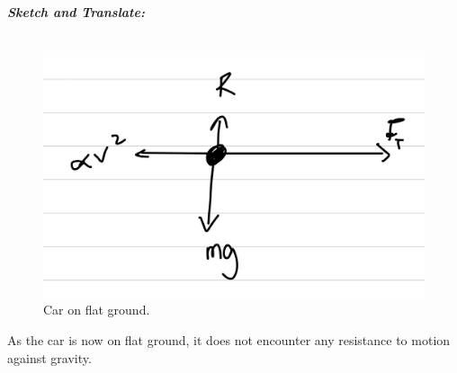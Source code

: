 \begin{subquestions}
\begin{subsubquestions}
	
\subsubquestion

\textbf{\textit{Sketch and Translate:}} \\ \\
\begin{figure}[H]
	\begin{center}
		\includegraphics[scale=0.25]{../2009/figures/2009q5-2}
		\caption{\label{2009:q5:Sketch2} Car on flat ground.}
	\end{center}
\end{figure}	
As the car is now on flat ground, it does not encounter any resistance to motion against gravity.





\end{subsubquestions}
\end{subquestions}
